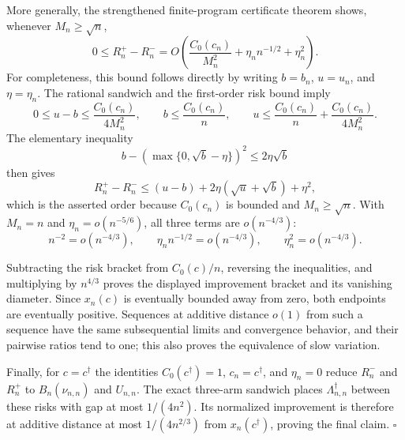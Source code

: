 More generally, the strengthened finite-program certificate theorem shows, whenever \(M_n\geq\sqrt n\),
\[
 0\leq R_n^+-R_n^-
 =O\!\left(
 \frac{C_0(c_n)}{M_n^2}+\eta_nn^{-1/2}+\eta_n^2
 \right).
\]
For completeness, this bound follows directly by writing \(b=b_n\), \(u=u_n\), and \(\eta=\eta_n\).  The rational sandwich and the first-order risk bound imply
\[
 0\leq u-b\leq\frac{C_0(c_n)}{4M_n^2},
 \qquad
 b\leq\frac{C_0(c_n)}n,
 \qquad
 u\leq\frac{C_0(c_n)}n+\frac{C_0(c_n)}{4M_n^2}.
\]
The elementary inequality
\[
 b-\left(\max\{0,\sqrt b-\eta\}\right)^2
 \leq2\eta\sqrt b
\]
then gives
\[
 R_n^+-R_n^-
 \leq (u-b)+2\eta(\sqrt u+\sqrt b)+\eta^2,
\]
which is the asserted order because \(C_0(c_n)\) is bounded and \(M_n\geq\sqrt n\).  With \(M_n=n\) and \(\eta_n=o(n^{-5/6})\), all three terms are \(o(n^{-4/3})\):
\[
 n^{-2}=o(n^{-4/3}),\qquad
 \eta_nn^{-1/2}=o(n^{-4/3}),\qquad
 \eta_n^2=o(n^{-4/3}).
\]

Subtracting the risk bracket from \(C_0(c)/n\), reversing the inequalities, and multiplying by \(n^{4/3}\) proves the displayed improvement bracket and its vanishing diameter.  Since \(x_n(c)\) is eventually bounded away from zero, both endpoints are eventually positive.  Sequences at additive distance \(o(1)\) from such a sequence have the same subsequential limits and convergence behavior, and their pairwise ratios tend to one; this also proves the equivalence of slow variation.

Finally, for \(c=c^\dagger\) the identities \(C_0(c^\dagger)=1\), \(c_n=c^\dagger\), and \(\eta_n=0\) reduce \(R_n^-\) and \(R_n^+\) to \(B_n(\nu_{n,n})\) and \(U_{n,n}\).  The exact three-arm sandwich places \(\Lambda_{n,n}^\dagger\) between these risks with gap at most \(1/(4n^2)\).  Its normalized improvement is therefore at additive distance at most \(1/(4n^{2/3})\) from \(x_n(c^\dagger)\), proving the final claim. \(\square\)